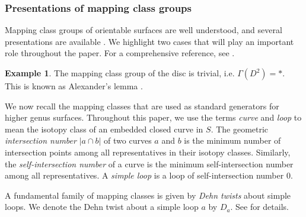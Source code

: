 \documentclass{amsart}
\theoremstyle{definition}
\newtheorem{example}[theorem]{Example}%
\numberwithin{equation}{section}
\begin{document}
\subsubsection{Presentations of mapping class groups}\label{subsubsec:presentations of mapping class groups} 

Mapping class groups of orientable surfaces are well understood, and several presentations are available \cite{GERVAIS2001703,humphries,Hatcher_Thurston,Wajnryb}. We highlight two cases that will play an important role throughout the paper. For a comprehensive reference, see \cite{farb-marg}.

\begin{example}
    The mapping class group of the disc is trivial, i.e. $\Gamma(D^2)=*$. This is known as Alexander’s lemma \cite[Lemma~2.1]{farb-marg}.
\end{example}

We now recall the mapping classes that are used as standard generators for higher genus surfaces.
Throughout this paper, we use the terms \emph{curve} and \emph{loop} to mean the isotopy class of an embedded closed curve in $S$. The geometric \emph{intersection number} $|a\cap b|$ of two curves $a$ and $b$ is the minimum number of intersection points among all representatives in their isotopy classes. Similarly, the \emph{self-intersection number} of a curve is the minimum self-intersection number among all representatives. A \emph{simple loop} is a loop of self-intersection number $0$. 

A fundamental family of mapping classes is given by \emph{Dehn twists} about simple loops. We denote the Dehn twist about a simple loop $a$ by $D_a$. 
See \cite[Section~4.4]{MR2850125} for details.
\end{document}
